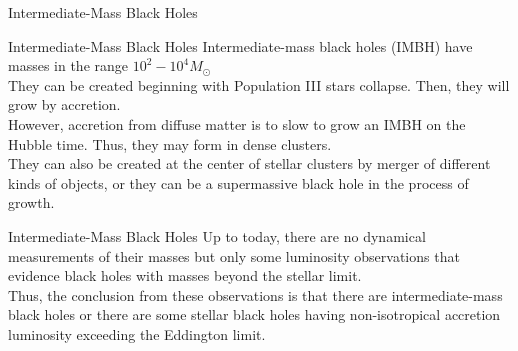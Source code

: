 \documentclass{beamer}
\begin{document}
\begin{frame}
\Huge
Intermediate-Mass Black Holes
\end{frame}

\begin{frame}{Intermediate-Mass Black Holes}
	\onslide<1-> 
    Intermediate-mass black holes (IMBH) have masses in the range $10^2 - 10^4 M_\odot\ $ \\
	\pause    
    \bigskip
    They can be created beginning with Population III stars collapse. Then, they will grow by accretion.\\
    \pause    
    \bigskip
    However, accretion from diffuse matter is to slow to grow an IMBH on the Hubble time. Thus, they may form in dense clusters.\\
    \pause    
    \bigskip
    They can also be created at the center of stellar clusters by merger of different kinds of objects, or they can be a supermassive black hole in the process of growth.\\
\end{frame}

\begin{frame}{Intermediate-Mass Black Holes}
	\onslide<1-> 
     Up to today, there are no dynamical measurements of their masses but only some luminosity observations that evidence black holes with masses beyond the stellar limit.\\
    \pause    
    \bigskip
    Thus, the conclusion from these observations is that there are intermediate-mass black holes or there are some stellar black holes having non-isotropical accretion luminosity exceeding the Eddington limit. 
\end{frame}
\end{document}
